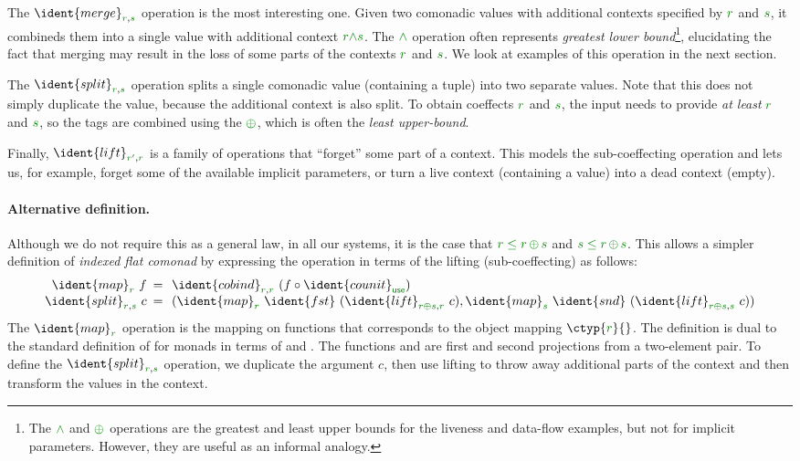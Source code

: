\noindent
The $\ident{merge}_{\cclrd{r},\cclrd{s}}$ operation is the most interesting one. Given two comonadic
values with additional contexts specified by $\cclrd{r}$ and $\cclrd{s}$, it combineds them into a 
single value with additional context $\cclrd{r}\czip\cclrd{s}$. The $\czip$ operation often represents
\emph{greatest lower bound}\footnote{The $\czip$ and $\cpar$ operations are the greatest and least upper 
bounds for the liveness and data-flow examples, but not for implicit parameters. However, they are useful 
as an informal analogy.}, elucidating the fact that merging may result in the loss of some parts of 
the contexts $\cclrd{r}$ and $\cclrd{s}$. We look at examples of this operation in the next section.

The $\ident{split}_{\cclrd{r},\cclrd{s}}$ operation splits a single comonadic value (containing a tuple)
into two separate values. Note that this does not simply duplicate the value, because the additional
context is also split. To obtain coeffects $\cclrd{r}$ and $\cclrd{s}$, the input needs to provide 
\emph{at least} $\cclrd{r}$ and $\cclrd{s}$, so the tags are combined using the $\cpar$, which is often 
the \emph{least upper-bound}\footnotemark[1].

Finally, $\ident{lift}_{\cclrd{r'}, \cclrd{r}}$ is a family of operations that ``forget'' some part of
a context. This models the sub-coeffecting operation and lets us, for example, forget some of the
available implicit parameters, or turn a live context (containing a value) into a dead context (empty).

\paragraph{Alternative definition.}
Although we do not require this as a general law, in all our systems, it is the case that
$\cclrd{r} \;\cleq\; \cclrd{r}\,\cpar\,\cclrd{s}$ and $\cclrd{s} \;\cleq\; \cclrd{r}\,\cpar\,\cclrd{s}$.
This allows a simpler definition of \emph{indexed flat comonad} by expressing the  operation
in terms of the lifting (sub-coeffecting) as follows:
%
\begin{equation*}
\begin{array}{rcl}
\ident{map}_{\cclrd{r}}~f &\narrow{=}& \ident{cobind}_{\cclrd{r}, \cclrd{r}}~(f\circ\ident{counit}_{\cunit}) \\
\ident{split}_{\cclrd{r}, \cclrd{s}}~c &\narrow{=}&
  ( \ident{map}_{\cclrd{r}}~\ident{fst}~(\ident{lift}_{\cclrd{r}\cpar\cclrd{s}, \cclrd{r}}~c), 
    \ident{map}_{\cclrd{s}}~\ident{snd}~(\ident{lift}_{\cclrd{r}\cpar\cclrd{s}, \cclrd{s}}~c) )
\end{array}
\end{equation*}
%
The $\ident{map}_{\cclrd{r}}$ operation is the mapping on functions that corresponds to the object 
mapping $\ctyp{\cclrd{r}}{}$. The definition is dual to the standard definition of  
for monads in terms of  and . The functions  and 
are first and second projections from a two-element pair. To define the 
$\ident{split}_{\cclrd{r}, \cclrd{s}}$ operation, we duplicate the argument $c$, then use 
lifting to throw away additional parts of the context and then transform the values in the 
context.

